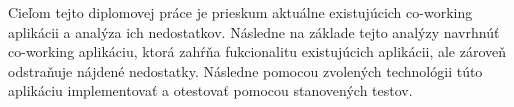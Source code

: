 Cieľom tejto diplomovej práce je prieskum aktuálne existujúcich co-working aplikácii a analýza ich nedostatkov. Následne na základe tejto analýzy navrhnúť co-working aplikáciu, ktorá zahŕňa fukcionalitu existujúcich aplikácii, ale zároveň odstraňuje nájdené nedostatky. Následne pomocou zvolených technológii túto aplikáciu implementovať a otestovať pomocou stanovených testov.
